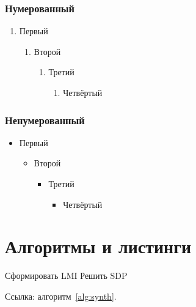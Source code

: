 \documentclass[font=modern]{cmcmsuthesis-doctoral}
\begin{document}
\subsection{Нумерованный}
\begin{enumerate}\item Первый\begin{enumerate}\item Второй\begin{enumerate}\item Третий\begin{enumerate}\item Четвёртый\end{enumerate}\end{enumerate}\end{enumerate}\end{enumerate}
\subsection{Ненумерованный}
\begin{itemize}\item Первый\begin{itemize}\item Второй\begin{itemize}\item Третий\begin{itemize}\item Четвёртый\end{itemize}\end{itemize}\end{itemize}\end{itemize}

\chapter{Алгоритмы и листинги}

\begin{algorithm}[H]\caption{Синтез стабилизации}\label{alg:synth}
Сформировать LMI\;
Решить SDP
\end{algorithm}
Ссылка: алгоритм~\ref{alg:synth}.
\end{document}

